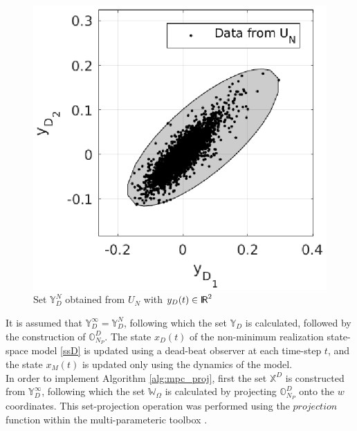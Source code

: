 \documentclass[letterpaper, 10 pt, conference]{ieeeconf}  %
\newcommand*{\RR}{%
	\textsf{I\kern-.3ex R}%
}
\begin{document}
	\begin{figure}[h]
		\hspace{30pt}
		\includegraphics[scale=0.6]{Y_D_set.eps}
		\caption{Set $\mathbb{Y}_D^N$ obtained from $U_N$ with $y_D(t) \in \RR^{2}$}
		\label{Y_D^inf}
	\end{figure} 
It is assumed that $\mathbb{Y}_D^{\infty}=\mathbb{Y}_D^N$, following which the set $\mathbb{Y}_D$ is calculated, followed by the construction of $\mathbb{O}_{N_P}^D$. The state $x_D(t)$ of the non-minimum realization state-space model \eqref{ssD} is updated using a dead-beat observer at each time-step $t$, and the state $x_M(t)$ is updated only using the dynamics of the model.
\\
\indent
In order to implement Algorithm \ref{alg:mpc_proj}, first the set $\mathbb{X}^D$ is constructed from $\mathbb{Y}_D^{\infty}$, following which the set $\mathbb{W}_{\Omega}$ is calculated by projecting $\mathbb{O}_{N_P}^D$ onto the $w$ coordinates. This set-projection operation was performed using the $projection$ function within the multi-parameteric toolbox \cite{mpt}. 
\end{document}
